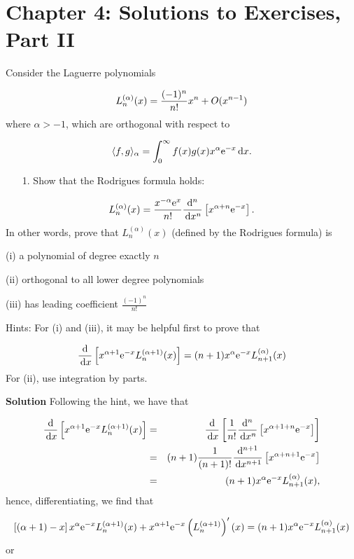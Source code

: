 \documentclass[12pt,a4paper]{article}
\begin{document}
\section{Chapter 4: Solutions to Exercises, Part II}
Consider the Laguerre polynomials

\[
L_n^{(\alpha)}(x) = {(-1)^n \over n! } x^n + O(x^{n-1})
\]
where $\alpha > -1$, which are orthogonal with respect to

\[
\langle f,g\rangle_\alpha = \int_0^\infty f(x) g(x) x^\alpha {\rm e}^{-x}\,{\rm d}x.
\]
\begin{itemize}
\item[1. ] Show that the Rodrigues formula holds:

\end{itemize}
\[
L_n^{(\alpha)}(x) = {x^{-\alpha} {\rm e}^x \over n!} {{\rm d}^n \over \,{\rm d}x^n}\left[x^{\alpha+n}{\rm e}^{-x}\right].
\]
In other words, prove that $L_n^{(\alpha)}(x)$ (defined by the Rodrigues formula) is

(i) a polynomial of degree exactly $n$

(ii) orthogonal to all lower degree polynomials 

(iii) has leading coefficient $\frac{(-1)^n}{n!}$

Hints: For (i) and (iii), it may be helpful first to prove that

\[
{{\rm d} \over \,{\rm d}x}\left[x^{\alpha+1} {\rm e}^{-x} L_n^{(\alpha+1)}(x) \right]  = (n+1)x^{\alpha} {\rm e}^{-x}L_{n+1}^{(\alpha)}(x)
\]
For (ii), use integration by parts.

\textbf{Solution} Following the hint, we have that


\begin{eqnarray*}
{{\rm d} \over \,{\rm d}x}\left[x^{\alpha+1} {\rm e}^{-x} L_n^{(\alpha+1)}(x) \right]  &=& {{\rm d} \over \,{\rm d}x}\left[ {1 \over n!} {{\rm d}^n \over \,{\rm d}x^n}\left[x^{\alpha+1+n}{\rm e}^{-x}\right] \right] \\
&=& (n+1) {1 \over (n+1)!} {{\rm d}^{n+1} \over \,{\rm d}x^{n+1}}\left[x^{\alpha+n+1}{\rm e}^{-x}\right] \\
&=& (n+1)x^{\alpha} {\rm e}^{-x}L_{n+1}^{(\alpha)}(x),
\end{eqnarray*}
hence, differentiating, we find that

\[
\left[(\alpha + 1) - x   \right]x^{\alpha} {\rm e}^{-x} L_n^{(\alpha+1)}(x) + x^{\alpha+1} {\rm e}^{-x} \left(L_n^{(\alpha+1)}\right)'(x) = (n+1)x^{\alpha} {\rm e}^{-x}L_{n+1}^{(\alpha)}(x)
\]
or 
\end{document}
